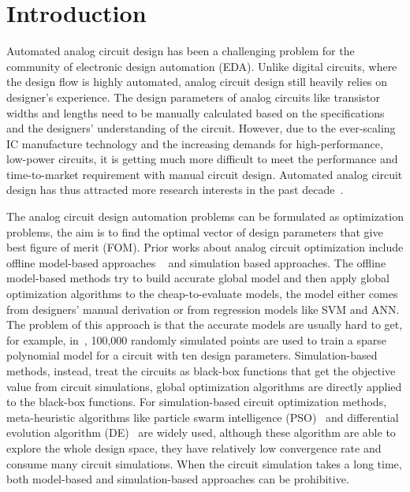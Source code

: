\section{Introduction}

Automated analog circuit design has been a challenging problem for the
community of electronic design automation (EDA). Unlike digital circuits, where
the design flow is highly automated, analog circuit design still
heavily relies on designer's experience. The design parameters of analog circuits like
transistor widths and lengths need to be manually calculated based on the
specifications and the designers' understanding of the circuit. However, due to
the ever-scaling IC manufacture technology and the increasing demands for
high-performance, low-power circuits, it is getting much more difficult to meet
the performance and time-to-market requirement with manual circuit design.
Automated analog circuit design has thus attracted more research interests in
the past decade~\cite{rutenbar2007hierarchical}.

The analog circuit design automation problems can be formulated as optimization
problems, the aim is to find the optimal vector of design parameters that give
best figure of merit (FOM). Prior works about analog circuit optimization
include offline model-based approaches
~\cite{colleran2003optimization,daems2003simulation,wang2014enabling} and
simulation based approaches. The offline model-based methods try to build
accurate global model and then apply global optimization algorithms to the
cheap-to-evaluate models, the model either comes from designers' manual
derivation or from regression models like SVM and ANN. The problem of this
approach is that the accurate models are usually hard to get, for example,
in~\cite{wang2014enabling}, 100,000 randomly simulated points are used to train
a sparse polynomial model for a circuit with ten design parameters.
Simulation-based methods, instead, treat the circuits as black-box functions
that get the objective value from circuit simulations, global optimization
algorithms are directly applied to the black-box functions. For
simulation-based circuit optimization methods, meta-heuristic algorithms like
particle swarm intelligence (PSO)~\cite{phelps2000anaconda} and differential
evolution algorithm (DE)~\cite{liu2009analog} are widely used, although these
algorithm are able to explore the whole design space, they have relatively low
convergence rate and consume many circuit simulations. When the circuit
simulation takes a long time, both model-based and simulation-based approaches
can be prohibitive.

